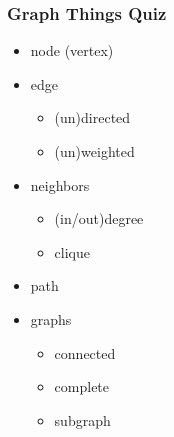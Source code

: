 \documentclass[xcolor={dvipsnames}]{beamer}
\begin{document}
\frame
{
\frametitle{Graph Things Quiz}

\begin{itemize}
\item node (vertex)
\item<2-> edge
\begin{itemize}
\item<3-> (un)directed
\item<4-> (un)weighted
\end{itemize}
\item<5-> neighbors
\begin{itemize}
\item<6-> (in/out)degree
\item<7-> clique
\end{itemize}
\item<8-> path
\item<9-> graphs
\begin{itemize}
\item<10-> connected
\item<11-> complete
\item<12-> subgraph
\end{itemize}

\end{itemize}

}
\end{document}
